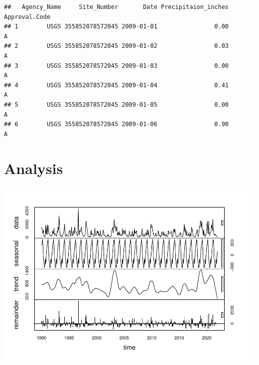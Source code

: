 \documentclass[
  12pt,
]{article}
\newenvironment{Shaded}{\begin{snugshade}}{\end{snugshade}}
\newcommand{\AttributeTok}[1]{\textcolor[rgb]{0.77,0.63,0.00}{#1}}
\newcommand{\DecValTok}[1]{\textcolor[rgb]{0.00,0.00,0.81}{#1}}
\newcommand{\FunctionTok}[1]{\textcolor[rgb]{0.00,0.00,0.00}{#1}}
\newcommand{\NormalTok}[1]{#1}
\newcommand{\OtherTok}[1]{\textcolor[rgb]{0.56,0.35,0.01}{#1}}
\newcommand{\SpecialCharTok}[1]{\textcolor[rgb]{0.00,0.00,0.00}{#1}}
\newcommand{\StringTok}[1]{\textcolor[rgb]{0.31,0.60,0.02}{#1}}
\begin{document}
\begin{verbatim}
##   Agency_Name     Site_Number       Date Precipitaion_inches Approval.Code
## 1        USGS 355852078572045 2009-01-01                0.00             A
## 2        USGS 355852078572045 2009-01-02                0.03             A
## 3        USGS 355852078572045 2009-01-03                0.00             A
## 4        USGS 355852078572045 2009-01-04                0.41             A
## 5        USGS 355852078572045 2009-01-05                0.00             A
## 6        USGS 355852078572045 2009-01-06                0.90             A
\end{verbatim}

\newpage

\hypertarget{analysis}{%
\section{Analysis}\label{analysis}}

\begin{Shaded}
\end{Shaded}

\includegraphics{Project_files/figure-latex/time-series analysis on Regular Water Resources-1.pdf}
\end{document}
